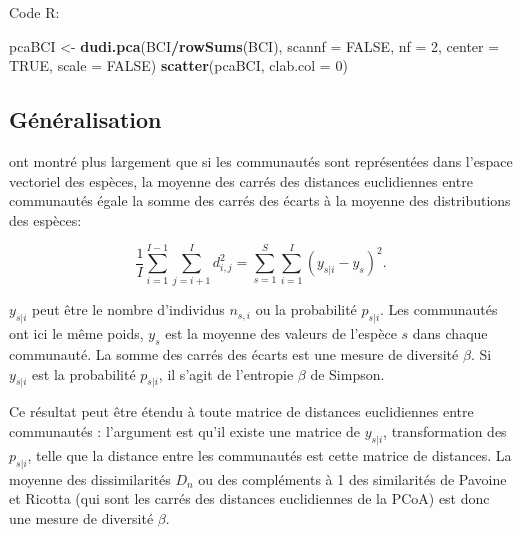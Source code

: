 \documentclass[
  11pt,
  french,
  a4paper,
  extrafontsizes,onecolumn,openright
  ]{memoir}
\newenvironment{Shaded}{\begin{snugshade}}{\end{snugshade}}
\newcommand{\DataTypeTok}[1]{\textcolor[rgb]{0.13,0.29,0.53}{#1}}
\newcommand{\DecValTok}[1]{\textcolor[rgb]{0.00,0.00,0.81}{#1}}
\newcommand{\KeywordTok}[1]{\textcolor[rgb]{0.13,0.29,0.53}{\textbf{#1}}}
\newcommand{\NormalTok}[1]{#1}
\newcommand{\OperatorTok}[1]{\textcolor[rgb]{0.81,0.36,0.00}{\textbf{#1}}}
\newcommand{\OtherTok}[1]{\textcolor[rgb]{0.56,0.35,0.01}{#1}}
\newcommand{\StringTok}[1]{\textcolor[rgb]{0.31,0.60,0.02}{#1}}
\begin{document}
Code R:

\scriptsize

\begin{Shaded}
\begin{Highlighting}[]
\NormalTok{pcaBCI <-}\StringTok{ }\KeywordTok{dudi.pca}\NormalTok{(BCI}\OperatorTok{/}\KeywordTok{rowSums}\NormalTok{(BCI), }\DataTypeTok{scannf =} \OtherTok{FALSE}\NormalTok{, }\DataTypeTok{nf =} \DecValTok{2}\NormalTok{, }
    \DataTypeTok{center =} \OtherTok{TRUE}\NormalTok{, }\DataTypeTok{scale =} \OtherTok{FALSE}\NormalTok{)}
\KeywordTok{scatter}\NormalTok{(pcaBCI, }\DataTypeTok{clab.col =} \DecValTok{0}\NormalTok{)}
\end{Highlighting}
\end{Shaded}

\normalsize

\hypertarget{guxe9nuxe9ralisation}{%
\subsection{Généralisation}\label{guxe9nuxe9ralisation}}

\textcite{Legendre1999} ont montré plus largement que si les communautés sont représentées dans l'espace vectoriel des espèces, la moyenne des carrés des distances euclidiennes entre communautés égale la somme des carrés des écarts à la moyenne des distributions des espèces:

\begin{equation}
  \label{eq:Legendre1999}
  \frac{1}{I} \sum_{i=1}^{I-1}{\sum_{j=i+1}^{I}{d_{i,j}^2}}
  = \sum_{s=1}^{S}{\sum_{i=1}^{I}{\left(y_{s|i}-y_s \right)^2}}.
\end{equation}

\(y_{s|i}\) peut être le nombre d'individus \(n_{s,i}\) ou la probabilité \(p_{s|i}\).
Les communautés ont ici le même poids, \(y_s\) est la moyenne des valeurs de l'espèce \(s\) dans chaque communauté.
La somme des carrés des écarts est une mesure de diversité \(\beta\).
Si \(y_{s|i}\) est la probabilité \(p_{s|i}\), il s'agit de l'entropie \(\beta\) de Simpson.

Ce résultat peut être étendu à toute matrice de distances euclidiennes entre communautés \autocite{Legendre2005} : l'argument est qu'il existe une matrice de \(y_{s|i}\), transformation des \(p_{s|i}\), telle que la distance entre les communautés est cette matrice de distances.
La moyenne des dissimilarités \(D_n\) ou des compléments à 1 des similarités de Pavoine et Ricotta (qui sont les carrés des distances euclidiennes de la PCoA) est donc une mesure de diversité \(\beta\).
\end{document}

